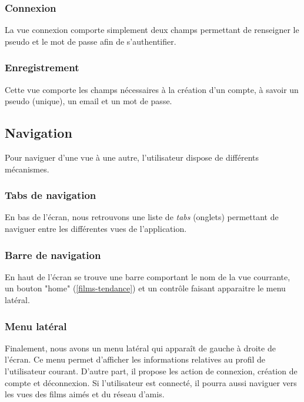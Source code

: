 \subsubsection{Connexion}
La vue connexion comporte simplement deux champs permettant de renseigner le pseudo et le mot de passe afin de s'authentifier.

\subsubsection{Enregistrement}
Cette vue comporte les champs nécessaires à la création d'un compte, à savoir un pseudo (unique), un email et un mot de passe.

\subsection{Navigation}
Pour naviguer d'une vue à une autre, l'utilisateur dispose de différents mécanismes.

\subsubsection{Tabs de navigation}
En bas de l'écran, nous retrouvons une liste de \textit{tabs} (onglets) permettant de naviguer entre les différentes vues de l'application.

\subsubsection{Barre de navigation}
En haut de l'écran se trouve une barre comportant le nom de la vue courrante, un bouton "home" (\ref{films-tendance}) et un contrôle faisant apparaitre le menu latéral.

\subsubsection{Menu latéral}
Finalement, nous avons un menu latéral qui apparaît de gauche à droite de l'écran. Ce menu permet d'afficher les informations relatives au profil de l'utilisateur courant. D'autre part, il propose les action de connexion, création de compte et déconnexion. Si l'utilisateur est connecté, il pourra aussi naviguer vers les vues des films aimés et du réseau d'amis.
